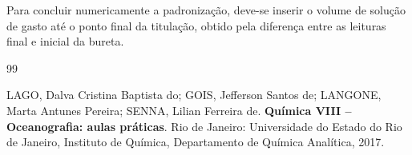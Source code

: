 \documentclass[a4paper,12pt]{article}
\begin{document}
\begin{tcolorbox}[
  title=Dado experimental ainda necessário,
  colback=quadrocinza,
  colframe=black!65,
  boxrule=0.6pt,
  arc=1mm
]
Para concluir numericamente a padronização, deve-se inserir o volume de solução de  gasto até o ponto final da titulação, obtido pela diferença entre as leituras final e inicial da bureta.
\end{tcolorbox}

\newpage
{}
{}
\begin{thebibliography}{99}

LAGO, Dalva Cristina Baptista do;
GOIS, Jefferson Santos de;
LANGONE, Marta Antunes Pereira;
SENNA, Lilian Ferreira de.
\textbf{Química VIII -- Oceanografia: aulas práticas}.
Rio de Janeiro: Universidade do Estado do Rio de Janeiro, Instituto de Química, Departamento de Química Analítica, 2017.

\end{thebibliography}
\end{document}
